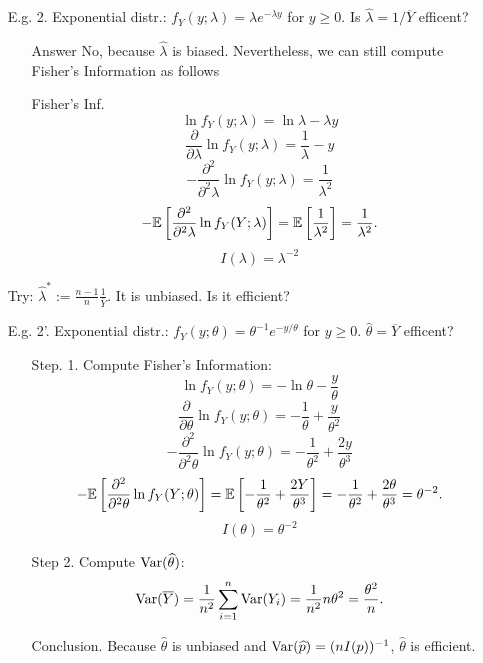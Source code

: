 \begin{frame}
\begin{enumerate}
 \item[E.g. 2.] Exponential distr.: $f_Y(y;\lambda)=\lambda e^{-\lambda y}$ for $y\ge 0$. Is $\widehat{\lambda} = 1/\overline{Y}$ efficent?\\[1em]
 \begin{enumerate}
  \item[Answer] No, because  $\widehat{\lambda} $ is biased. Nevertheless, we can still compute Fisher's Information as follows
  \vfill
  \item[Fisher's Inf.]
  \[
 \ln f_Y(y;\lambda) = \ln\lambda -\lambda y
 \]\pause
 \[
 \frac{\partial}{\partial \lambda} \ln f_Y(y;\lambda) = \frac{1}{\lambda} -y
 \]\pause
 \[
 -\frac{\partial^2}{\partial^2 \lambda} \ln f_Y(y;\lambda) = \frac{1}{\lambda^2}
 \]\pause
 \[
 -\mathbb{E}\left[\frac{\partial^2}{\partial^2 \lambda} \ln f_Y(Y;\lambda)\right]
 = \mathbb{E}\left[\frac{1}{\lambda^2} \right]
 =\frac{1}{\lambda^2}.
 \]\pause
 \vfill
 \[\boxed{I(\lambda) = \lambda^{-2}}\]
 \end{enumerate}
 \vfill
 \item[Try:] $\widehat\lambda^*:=\frac{n-1}{n}\frac{1}{\overline{Y}}$. It is unbiased. Is it efficient?
 \end{enumerate}
\end{frame}
\begin{frame}
\begin{enumerate}
 \item[E.g. 2'.] Exponential distr.: $f_Y(y;\theta)=\theta^{-1} e^{-y/\theta}$ for $y\ge 0$.  $\widehat{\theta}=\overline{Y}$ efficent?\\[1em]
 \begin{itemize}
  \item[Step. 1.] Compute Fisher's Information:
  \[
 \ln f_Y(y;\theta) = -\ln\theta-\frac{y}{\theta}
 \]\pause
 \[
 \frac{\partial}{\partial \theta} \ln f_Y(y;\theta) = -\frac{1}{\theta} +\frac{y}{\theta^2}
 \]\pause
 \[
 -\frac{\partial^2}{\partial^2 \theta} \ln f_Y(y;\theta) = -\frac{1}{\theta^2} + \frac{2y}{\theta^3}
 \]\pause
 \[
 -\mathbb{E}\left[\frac{\partial^2}{\partial^2 \theta} \ln f_Y(Y;\theta)\right]
 = \mathbb{E}\left[-\frac{1}{\theta^2} + \frac{2Y}{\theta^3}  \right]
 =-\frac{1}{\theta^2}+ \frac{2\theta}{\theta^3} = \theta^{-2}.
 \]\pause
  \[\boxed{I(\theta) = \theta^{-2}}\]
 \item[Step 2.] Compute $\text{Var}(\widehat{\theta})$:
 \[
 \text{Var}(\overline{Y}) = \frac{1}{n^2}\sum_{i=1}^n \text{Var}(Y_i) =  \frac{1}{n^2} n \theta^2 = \frac{\theta^2}{n}.
 \]
 \item[Conclusion.] Because $\widehat{\theta}$ is unbiased  and $ \text{Var}(\widehat{p}) = (n I(p))^{-1}$, $\widehat{\theta}$ is efficient.
 \end{itemize}
\end{enumerate}
\end{frame}
